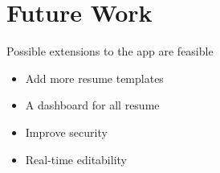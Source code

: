 \documentclass[12pt]{article}
\begin{document}
\section*{\LARGE{Future Work}}
{\justify
Possible extensions to the app are feasible

\begin{itemize}
\item Add more resume templates
\item A dashboard for all resume
\item Improve security
\item Real-time editability
\end{itemize}
}


\end{document}
